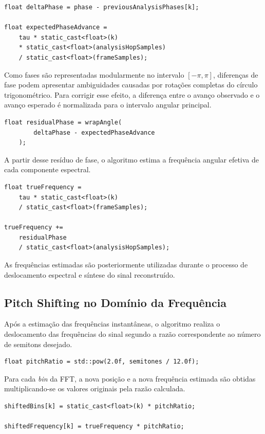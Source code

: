 \begin{verbatim}
float deltaPhase = phase - previousAnalysisPhases[k];

float expectedPhaseAdvance =
    tau * static_cast<float>(k)
    * static_cast<float>(analysisHopSamples)
    / static_cast<float>(frameSamples);
\end{verbatim}

Como fases são representadas modularmente no intervalo \([-\pi, \pi]\), diferenças de fase podem apresentar ambiguidades causadas por rotações completas do círculo trigonométrico. Para corrigir esse efeito, a diferença entre o avanço observado e o avanço esperado é normalizada para o intervalo angular principal.

\begin{verbatim}
float residualPhase = wrapAngle(
        deltaPhase - expectedPhaseAdvance
    );
\end{verbatim}

A partir desse resíduo de fase, o algoritmo estima a frequência angular efetiva de cada componente espectral.

\begin{verbatim}
float trueFrequency =
    tau * static_cast<float>(k)
    / static_cast<float>(frameSamples);

trueFrequency +=
    residualPhase
    / static_cast<float>(analysisHopSamples);
\end{verbatim}

As frequências estimadas são posteriormente utilizadas durante o processo de deslocamento espectral e síntese do sinal reconstruído.

\subsection{Pitch Shifting no Domínio da Frequência}

Após a estimação das frequências instantâneas, o algoritmo realiza o deslocamento das frequências do sinal segundo a razão correspondente ao número de semitons desejado.

\begin{verbatim}
float pitchRatio = std::pow(2.0f, semitones / 12.0f);
\end{verbatim}

Para cada \textit{bin} da FFT, a nova posição e a nova frequência estimada são obtidas multiplicando-se os valores originais pela razão calculada.

\begin{verbatim}
shiftedBins[k] = static_cast<float>(k) * pitchRatio;

shiftedFrequency[k] = trueFrequency * pitchRatio;
\end{verbatim}

